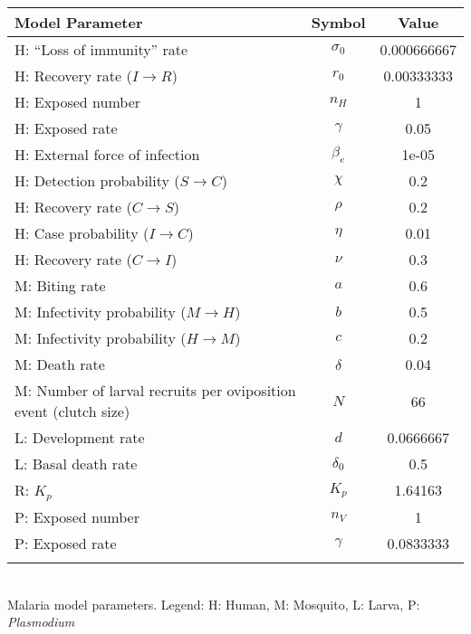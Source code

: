 \begin{table}
\noindent
\begin{tabular}{lcc}
{\bf Model Parameter} & {\bf Symbol} & {\bf Value}\\
\hline\hline
  H: ``Loss of immunity'' rate & $\sigma_0$ & 0.000666667\\
  H: Recovery rate ($I \rightarrow R$) & $r_0$ & 0.00333333\\
  H: Exposed number & $n_H$ & 1\\
  H: Exposed rate & $\gamma$ & 0.05\\
  H: External force of infection & $\beta_e$ & 1e-05\\
  H: Detection probability ($S \rightarrow C$) & $\chi$ & 0.2\\
  H: Recovery rate ($C \rightarrow S$) & $\rho$ & 0.2\\
  H: Case probability ($I \rightarrow C$) & $\eta$ & 0.01\\
  H: Recovery rate ($C \rightarrow I$) & $\nu$ & 0.3\\
  M: Biting rate & $a$ & 0.6\\
  M: Infectivity probability ($M \rightarrow H$) & $b$ & 0.5\\
  M: Infectivity probability ($H \rightarrow M$) & $c$ & 0.2\\
  M: Death rate & $\delta$ & 0.04\\
  M: Number of larval recruits per oviposition event (clutch size) & $N$ & 66\\
  L: Development rate & $d$ & 0.0666667\\
  L: Basal death rate & $\delta_0$ & 0.5\\
  R: $K_p$ & $K_p$ & 1.64163\\
  P: Exposed number & $n_V$ & 1\\
  P: Exposed rate & $\gamma$ & 0.0833333\\
\hline\hline
\smallskip
\end{tabular}\\
 Malaria model parameters. Legend: {\small H: Human, M: Mosquito, L: Larva, P: {\em Plasmodium}}
\end{table}

